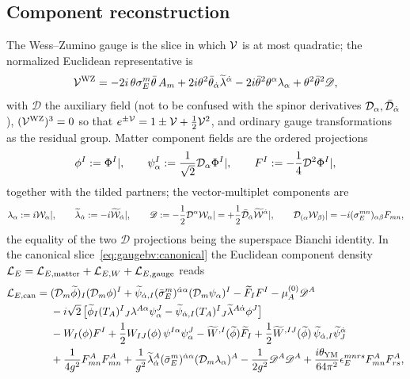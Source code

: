 \subsection{Component reconstruction}\label{sec:gaugebv:components}

The Wess--Zumino gauge is the slice in which $\mathcal{V}$ is at most quadratic; the normalized Euclidean representative is
\begin{equation}\label{eq:gaugebv:WZ}
\mathcal{V}^{\rm WZ}=-2i\,\theta\sigma_E^m\bar\theta\,A_m
+2i\theta^2\bar\theta_{\dot\alpha}\widetilde\lambda^{\dot\alpha}
-2i\bar\theta^2\theta^\alpha\lambda_\alpha
+\theta^2\bar\theta^2\mathscr D,
\end{equation}
with $\mathscr D$ the auxiliary field (not to be confused with the spinor derivatives $\mathcal{D}_\alpha,\bar{\mathcal{D}}_{\dot\alpha}$), $(\mathcal{V}^{\rm WZ})^3=0$ so that $e^{\pm\mathcal{V}}=1\pm\mathcal{V}+\tfrac12\mathcal{V}^2$, and ordinary gauge transformations as the residual group. Matter component fields are the ordered projections
\begin{equation}\label{eq:gaugebv:matterproj}
\phi^I:=\Phi^I|,\qquad
\psi_\alpha^I:=\frac1{\sqrt2}\mathcal{D}_\alpha\Phi^I|,\qquad
F^I:=-\frac14\mathcal{D}^2\Phi^I|,
\end{equation}
together with the tilded partners; the vector-multiplet components are
\begin{equation}\label{eq:gaugebv:vectorproj}
\lambda_\alpha:=i\mathcal{W}_\alpha|,\qquad
\widetilde\lambda_{\dot\alpha}:=-i\widetilde{\mathcal{W}}_{\dot\alpha}|,\qquad
\mathscr D:=-\frac12\mathcal{D}^\alpha\mathcal{W}_\alpha|=+\frac12\bar{\mathcal{D}}_{\dot\alpha}\widetilde{\mathcal{W}}^{\dot\alpha}|,\qquad
\mathcal{D}_{(\alpha}\mathcal{W}_{\beta)}|=-i(\sigma_E^{mn})_{\alpha\beta}F_{mn},
\end{equation}
the equality of the two $\mathscr D$ projections being the superspace Bianchi identity. In the canonical slice~\eqref{eq:gaugebv:canonical} the Euclidean component density $\mathcal L_E=\mathcal L_{E,\rm matter}+\mathcal L_{E,W}+\mathcal L_{E,\rm gauge}$ reads
\begin{equation}\label{eq:gaugebv:LEcan}
\begin{aligned}
\mathcal L_{E,\rm can}={}&
(\mathcal D_m\widetilde\phi)_I(\mathcal D_m\phi)^I
+\widetilde\psi_{\dot\alpha,I}(\bar\sigma_E^m)^{\dot\alpha\alpha}(\mathcal D_m\psi_\alpha)^I
-\widetilde F_IF^I-\mu_A^{(0)}\mathscr D^A\\
&-i\sqrt2\,\bigl[\widetilde\phi_I(T_A)^I{}_J\lambda^{A\alpha}\psi_\alpha^J
-\widetilde\psi_{\dot\alpha,I}(T_A)^I{}_J\widetilde\lambda^{A\dot\alpha}\phi^J\bigr]\\
&-W_I(\phi)F^I+\frac12W_{IJ}(\phi)\,\psi^{I\alpha}\psi_\alpha^J
-\widetilde W^{,I}(\widetilde\phi)\widetilde F_I
+\frac12\widetilde W^{,IJ}(\widetilde\phi)\,\widetilde\psi_{\dot\alpha,I}\widetilde\psi^{\dot\alpha}_J\\
&+\frac1{4g^2}F^A_{mn}F^A_{mn}
+\frac1{g^2}\widetilde\lambda^A_{\dot\alpha}(\bar\sigma_E^m)^{\dot\alpha\alpha}(\mathcal D_m\lambda_\alpha)^A
-\frac1{2g^2}\mathscr D^A\mathscr D^A
+\frac{i\theta_{\rm YM}}{64\pi^2}\epsilon_E^{mnrs}F^A_{mn}F^A_{rs},
\end{aligned}
\end{equation}
